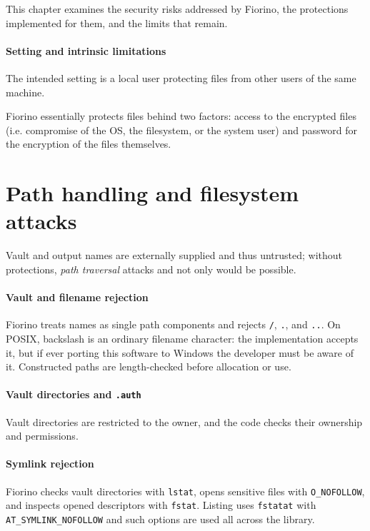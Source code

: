 This chapter examines the security risks addressed by Fiorino, the protections
implemented for them, and the limits that remain.

\paragraph{Setting and intrinsic limitations}
The intended setting is a
local user protecting files from other users of the same machine.

Fiorino essentially protects files behind two factors: access to the encrypted
files (i.e. compromise of the OS, the filesystem, or the system user) and password
for the encryption of the files themselves.

\section{Path handling and filesystem attacks}

Vault and output names are externally supplied and thus untrusted; without
protections, \textit{path traversal} attacks and not only would be possible.

\paragraph{Vault and filename rejection}
Fiorino treats names as single path
components and rejects \texttt{/}, \texttt{.}, and \texttt{..}. On POSIX,
backslash is an ordinary filename character: the implementation accepts it,
but if ever porting this software to Windows the developer must be aware of it.
Constructed paths are length-checked before allocation or use.

\paragraph{Vault directories and \texttt{.auth}}
Vault directories are restricted to the owner, and the code checks their ownership
and permissions.

\paragraph{Symlink rejection}
Fiorino checks vault
directories with \texttt{lstat}, opens sensitive files with
\texttt{O\_NOFOLLOW}, and inspects opened descriptors with \texttt{fstat}.
Listing uses \texttt{fstatat} with \texttt{AT\_SYMLINK\_NOFOLLOW} and such
options are used all across the library.

